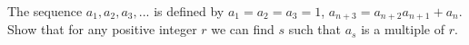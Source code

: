 The sequence $a_1, a_2, a_3, ...$ is defined by $a_1 = a_2 = a_3 = 1$, $a_{n+3} = a_{n+2}a_{n+1} + a_n$. Show that for any positive integer $r$ we can find $s$ such that $a_s$ is a multiple of $r$.